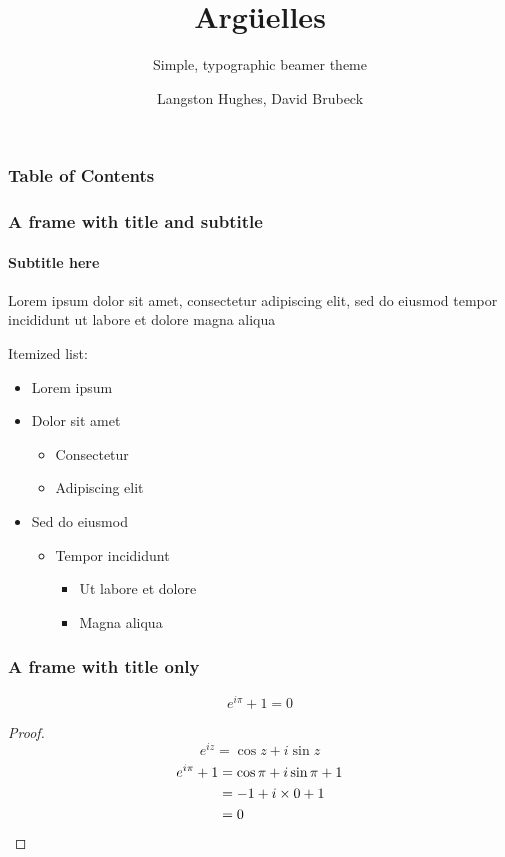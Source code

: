\documentclass[compress,12pt]{beamer}
\title{Argüelles}
\subtitle{Simple, typographic beamer theme}
\date{}
\author{Langston Hughes, David Brubeck}
\institute{University of \TeX}
\begin{document}
\frame[plain]{\titlepage}

\begin{frame}[plain]
  \frametitle{Table of Contents}
  
  \tableofcontents
\end{frame}


\begin{frame}
  \frametitle{A frame with title and subtitle}
  \framesubtitle{Subtitle here}
  Lorem ipsum dolor sit amet, consectetur adipiscing elit, sed do eiusmod tempor incididunt ut labore et dolore magna aliqua \par
  Itemized list:
  \begin{itemize}
    \item Lorem ipsum
    \item Dolor sit amet
          \begin{itemize}
            \item Consectetur
            \item Adipiscing elit
          \end{itemize}
    \item Sed do eiusmod
          \begin{itemize}
            \item Tempor incididunt
                  \begin{itemize}
                    \item Ut labore et dolore
                    \item Magna aliqua
                  \end{itemize}
          \end{itemize}
  \end{itemize}
\end{frame}

\begin{frame}
  \frametitle{A frame with title only}
  \begin{theorem}
    \[e^{i\pi}+1=0\]
    \begin{proof}
      \begin{equation*}
        e^{iz}=\cos{z}+i\sin{z}
      \end{equation*}
      \begin{align*}
        e^{i\pi}+1 & \null=\cos\pi+i\sin\pi+1 \\
                   & \null=-1+i\times0+1      \\
                   & \null=0
      \end{align*}
    \end{proof}
  \end{theorem}
\end{frame}
\end{document}

